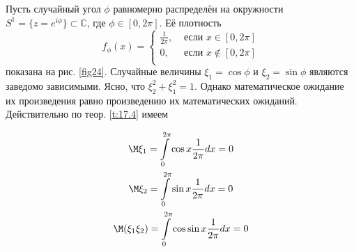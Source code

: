 \begin{example}
	Пусть случайный угол $\phi$ равномерно распределён на окружности 
	$S^1 = \{z = e^{i\phi}\} \subset \mathbb{C} $, где $\phi\in [0, 2\pi]$. Её плотность
	\begin{equation}
		f_{\phi}(x)=
		\begin{cases}
			\frac{1}{2\pi}, &\text{ если } x\in [0,2\pi]\\
			0, &\text{ если } x\notin [0,2\pi]\\
		\end{cases}
	\end{equation}
	показана на рис. \ref{fig24}. Случайные величины $\xi_1 = \cos\phi$ и $\xi_2 = \sin\phi$ являются заведомо зависимыми. Ясно, что $\xi_2^2+\xi_1^2=1$. Однако математическое ожидание их произведения равно произведению их математических ожиданий.
	Действительно по теор. \ref{t:17.4} имеем

	\begin{gather*}
		\M\xi_1=\int\limits_0^{2\pi}\cos x\frac{1}{2\pi}dx=0 
		\\
		\M\xi_2=\int\limits_0^{2\pi}\sin x\frac{1}{2\pi}dx=0
		\\
		\M(\xi_1\xi_2)=\int\limits_0^{2\pi}\cos\sin x\frac{1}{2\pi}dx=0
	\end{gather*}
\end{example}